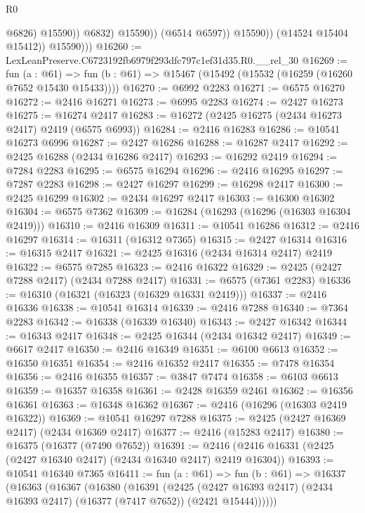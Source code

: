 \begin{lexlean}{R0}
\begin{coremodule}
                              @6826)
                            @15590))
                        @6832)
                      @15590))
                  (@6514 @6597))
                @15590))
            (@14524 @15404 @15412))
          @15590)))
@16260 := LexLeanPreserve.C6723192fb6979f293dfc797c1ef31d35.R0.__rel_30
@16269 := fun (a : @61) =>
  fun (b : @61) => @15467 (@15492 (@15532 (@16259 (@16260 @7652 @15430 @15433))))
@16270 := @6992 @2283
@16271 := @6575 @16270
@16272 := @2416 @16271
@16273 := @6995 @2283
@16274 := @2427 @16273
@16275 := @16274 @2417
@16283 := @16272 (@2425 @16275 (@2434 @16273 @2417) @2419 (@6575 @6993))
@16284 := @2416 @16283
@16286 := @10541 @16273 @6996
@16287 := @2427 @16286
@16288 := @16287 @2417
@16292 := @2425 @16288 (@2434 @16286 @2417)
@16293 := @16292 @2419
@16294 := @7284 @2283
@16295 := @6575 @16294
@16296 := @2416 @16295
@16297 := @7287 @2283
@16298 := @2427 @16297
@16299 := @16298 @2417
@16300 := @2425 @16299
@16302 := @2434 @16297 @2417
@16303 := @16300 @16302
@16304 := @6575 @7362
@16309 := @16284 (@16293 (@16296 (@16303 @16304 @2419)))
@16310 := @2416 @16309
@16311 := @10541 @16286
@16312 := @2416 @16297
@16314 := @16311 (@16312 @7365)
@16315 := @2427 @16314
@16316 := @16315 @2417
@16321 := @2425 @16316 (@2434 @16314 @2417) @2419
@16322 := @6575 @7285
@16323 := @2416 @16322
@16329 := @2425 (@2427 @7288 @2417) (@2434 @7288 @2417)
@16331 := @6575 (@7361 @2283)
@16336 := @16310 (@16321 (@16323 (@16329 @16331 @2419)))
@16337 := @2416 @16336
@16338 := @10541 @16314
@16339 := @2416 @7288
@16340 := @7364 @2283
@16342 := @16338 (@16339 @16340)
@16343 := @2427 @16342
@16344 := @16343 @2417
@16348 := @2425 @16344 (@2434 @16342 @2417)
@16349 := @6617 @2417
@16350 := @2416 @16349
@16351 := @6100 @6613
@16352 := @16350 @16351
@16354 := @2416 @16352 @2417
@16355 := @7478 @16354
@16356 := @2416 @16355
@16357 := @3847 @7474
@16358 := @6103 @6613
@16359 := @16357 @16358
@16361 := @2428 @16359 @2461
@16362 := @16356 @16361
@16363 := @16348 @16362
@16367 := @2416 (@16296 (@16303 @2419 @16322))
@16369 := @10541 @16297 @7288
@16375 := @2425 (@2427 @16369 @2417) (@2434 @16369 @2417)
@16377 := @2416 (@15283 @2417)
@16380 := @16375 (@16377 (@7490 @7652))
@16391 := @2416 (@2416 @16331 (@2425 (@2427 @16340 @2417) (@2434 @16340 @2417) @2419 @16304))
@16393 := @10541 @16340 @7365
@16411 := fun (a : @61) =>
  fun (b : @61) =>
  @16337
    (@16363
      (@16367
        (@16380
          (@16391
            (@2425
              (@2427 @16393 @2417)
              (@2434 @16393 @2417)
              (@16377 (@7417 @7652))
              (@2421 @15444))))))

\end{coremodule}
\end{lexlean}

